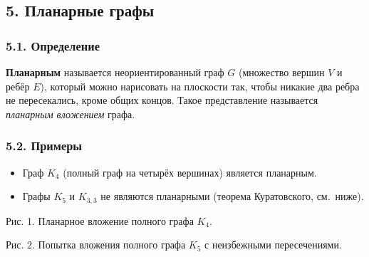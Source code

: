 \subsection{5. Планарные графы}

\subsubsection{5.1. Определение}

\textbf{Планарным} называется неориентированный граф $G$ (множество вершин $V$ и ребёр $E$), который можно нарисовать на плоскости так, чтобы никакие два ребра не пересекались, кроме общих концов. Такое представление называется \emph{планарным вложением} графа.

\subsubsection{5.2. Примеры}

\begin{itemize}[leftmargin=*]
  \item Граф $K_4$ (полный граф на четырёх вершинах) является планарным.
  \item Графы $K_5$ и $K_{3,3}$ не являются планарными (теорема Куратовского, см.~ниже).
\end{itemize}


\begin{center}

\small Рис. 1. Планарное вложение полного графа $K_4$.
\end{center}


\begin{center}

\small Рис. 2. Попытка вложения полного графа $K_5$ с неизбежными пересечениями.
\end{center}

